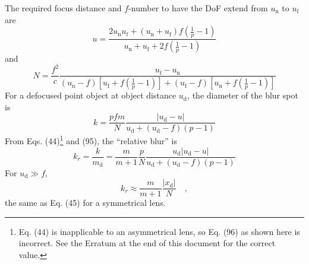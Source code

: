 \documentclass[11pt, oneside]{scrartcl}   	%
\begin{document}
The required focus distance and $f$-number to have the DoF extend from
$u_\mathrm{n}$ to $u_\mathrm{f}$ are
\begin{equation}
  \label{eq:93}
  u = \frac{2u_\mathrm{n}u_\mathrm{f} +
    (u_\mathrm{n}+u_\mathrm{f})f\left(\frac1p-1\right)}{u_\mathrm{n}+u_\mathrm{f}+2f\left(\frac1p-1\right)}
\end{equation}
and
\begin{equation}
  \label{eq:94}
  N=\frac{f^2}c\frac{u_\mathrm{f}-u_\mathrm{n}}{(u_\mathrm{n}-f)\left[u_\mathrm{f}+f\left(\frac1p-1\right)\right]+(u_\mathrm{f}-f)\left[u_\mathrm{n}+f\left(\frac1p-1\right)\right]}
\end{equation}
For a defocused point object at object distance $u_\mathrm{d}$, the diameter of
the blur spot is
\begin{equation}
  \label{eq:95}
  k  = \frac{pfm}N\frac{|u_\mathrm{d}-u|}{u_\mathrm{d}+(u_\mathrm{d}-f)(p-1)}
\end{equation}
From Eqs. (44)\footnote{Eq. (44) is inapplicable to an asymmetrical lens, so Eq. (96) as
shown here is incorrect. See the Erratum at the end
of this document for the correct value.} and (95), the “relative blur”
is
\begin{equation}
  \label{eq:96}
  k_r=\frac k {m_\mathrm{d}} = \frac m{m+1} \frac p N
  \frac{u_\mathrm{d}|u_\mathrm{d}-u|}{u_\mathrm{d}+(u_\mathrm{d}-f)(p-1)}
\end{equation}
For $u_\mathrm{d} \gg f$,
\begin{equation}
  \label{eq:97}
  k_r\approx \frac m{m+1} \frac{|x_\mathrm{d}|}N\quad,
\end{equation}
the same as Eq. (45) for a symmetrical lens.
\end{document}
